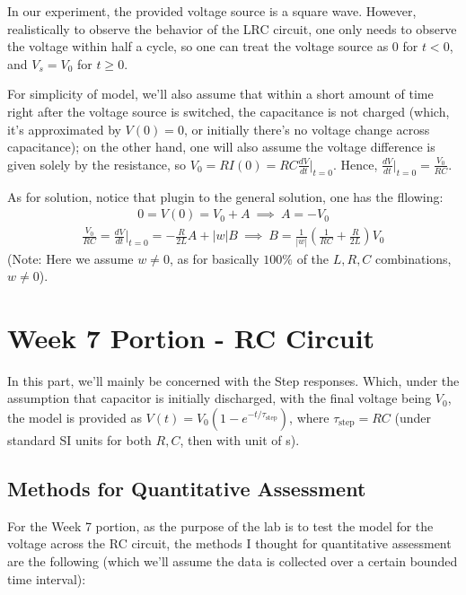 \documentclass{article}
\begin{document}
In our experiment, the provided voltage source is a square wave. However, realistically to observe the behavior of the LRC circuit, one only needs to observe the voltage within half a cycle, so one can treat the voltage source as $0$ for $t<0$, and $V_s=V_0$ for $t\geq 0$.

For simplicity of model, we'll also assume that within a short amount of time right after the voltage source is switched, the capacitance is not charged (which, it's approximated by $V(0)=0$, or initially there's no voltage change across capacitance); on the other hand, one will also assume the voltage difference is given solely by the resistance, so $V_0 = R I(0) = R C \frac{dV}{dt}\bigg|_{t=0}$. Hence, $\frac{dV}{dt}\bigg|_{t=0} = \frac{V_0}{RC}$.

\hfil

As for solution, notice that plugin to the general solution, one has the fllowing:
\begin{align}
    0=V(0)=V_0 + A\ \implies\ A = -V_0
\end{align}
\begin{align}
    \frac{V_0}{RC}=\frac{dV}{dt}\bigg|_{t=0} = -\frac{R}{2L}A+|w| B\ \implies\ B = \frac{1}{|w|}\left(\frac{1}{RC}+\frac{R}{2L}\right)V_0
\end{align}
(Note: Here we assume $w\neq 0$, as for basically $100\%$ of the $L,R,C$ combinations, $w\neq 0$).

\newpage

\section{Week 7 Portion - RC Circuit}

In this part, we'll mainly be concerned with the Step responses. Which, under the assumption that capacitor is initially discharged, with the final voltage being $V_0$, the model is provided as $V(t)=V_0 (1-e^{-t/\tau_\text{step}})$, where $\tau_\text{step} = RC$ (under standard SI units for both $R,C$, then with unit of s).

\hfil

\subsection{Methods for Quantitative Assessment}

For the Week 7 portion, as the purpose of the lab is to test the model for the voltage across the RC circuit, the methods I thought for quantitative assessment are the following (which we'll assume the data is collected over a certain bounded time interval):
\end{document}
